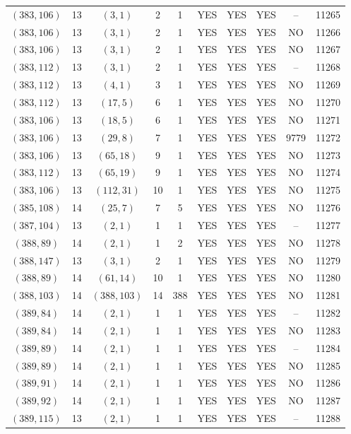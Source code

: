 \begin{longtable}{|c|c|c|c|c|c|c|c|c|c|}
$(383, 106)$ & 13 & $(3, 1)$ & 2 & 1 & YES & YES & YES & -- & 11265\\
$(383, 106)$ & 13 & $(3, 1)$ & 2 & 1 & YES & YES & YES & NO & 11266\\
$(383, 106)$ & 13 & $(3, 1)$ & 2 & 1 & YES & YES & YES & NO & 11267\\
$(383, 112)$ & 13 & $(3, 1)$ & 2 & 1 & YES & YES & YES & -- & 11268\\
$(383, 112)$ & 13 & $(4, 1)$ & 3 & 1 & YES & YES & YES & NO & 11269\\
$(383, 112)$ & 13 & $(17, 5)$ & 6 & 1 & YES & YES & YES & NO & 11270\\
$(383, 106)$ & 13 & $(18, 5)$ & 6 & 1 & YES & YES & YES & NO & 11271\\
$(383, 106)$ & 13 & $(29, 8)$ & 7 & 1 & YES & YES & YES & 9779 & 11272\\
$(383, 106)$ & 13 & $(65, 18)$ & 9 & 1 & YES & YES & YES & NO & 11273\\
$(383, 112)$ & 13 & $(65, 19)$ & 9 & 1 & YES & YES & YES & NO & 11274\\
$(383, 106)$ & 13 & $(112, 31)$ & 10 & 1 & YES & YES & YES & NO & 11275\\
$(385, 108)$ & 14 & $(25, 7)$ & 7 & 5 & YES & YES & YES & NO & 11276\\
$(387, 104)$ & 13 & $(2, 1)$ & 1 & 1 & YES & YES & YES & -- & 11277\\
$(388, 89)$ & 14 & $(2, 1)$ & 1 & 2 & YES & YES & YES & NO & 11278\\
$(388, 147)$ & 13 & $(3, 1)$ & 2 & 1 & YES & YES & YES & NO & 11279\\
$(388, 89)$ & 14 & $(61, 14)$ & 10 & 1 & YES & YES & YES & NO & 11280\\
$(388, 103)$ & 14 & $(388, 103)$ & 14 & 388 & YES & YES & YES & NO & 11281\\
$(389, 84)$ & 14 & $(2, 1)$ & 1 & 1 & YES & YES & YES & -- & 11282\\
$(389, 84)$ & 14 & $(2, 1)$ & 1 & 1 & YES & YES & YES & NO & 11283\\
$(389, 89)$ & 14 & $(2, 1)$ & 1 & 1 & YES & YES & YES & -- & 11284\\
$(389, 89)$ & 14 & $(2, 1)$ & 1 & 1 & YES & YES & YES & NO & 11285\\
$(389, 91)$ & 14 & $(2, 1)$ & 1 & 1 & YES & YES & YES & NO & 11286\\
$(389, 92)$ & 14 & $(2, 1)$ & 1 & 1 & YES & YES & YES & NO & 11287\\
$(389, 115)$ & 13 & $(2, 1)$ & 1 & 1 & YES & YES & YES & -- & 11288\\

\end{longtable}
